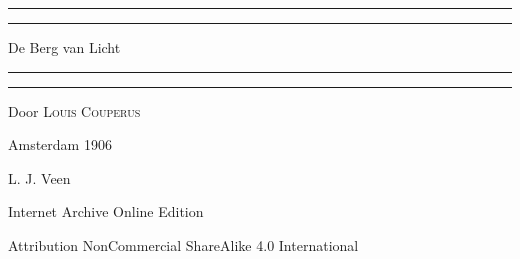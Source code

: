 \documentclass[a4paper, 12pt, oneside, dutch]{article}
\begin{document}
\begin{titlepage} %
	\centering %
	\scshape %

	
	\rule{\textwidth}{1.6pt}\vspace*{-\baselineskip}\vspace*{2pt} %
	\rule{\textwidth}{0.4pt} %
	
	\vspace{0.75\baselineskip} %

        {\Huge De Berg van Licht \\} %
	
	\vspace{0.75\baselineskip} %
	
	\rule{\textwidth}{0.4pt}\vspace*{-\baselineskip}\vspace{3.2pt} %
	\rule{\textwidth}{1.6pt} %
	
	\vspace{1\baselineskip} %
	
	
	{Door \scshape\Large Louis Couperus \\} %
	
	\vspace*{1\baselineskip} %
	


	\vspace{1\baselineskip} %

	
	
		
	\vspace*{\fill}%
	
	Amsterdam 1906 %
	
	{\small L. J. Veen } %

	\vspace{1\baselineskip} %

        Internet Archive Online Edition  %
	
	{\small Attribution NonCommercial ShareAlike 4.0 International } %
\end{titlepage}
\end{document}
